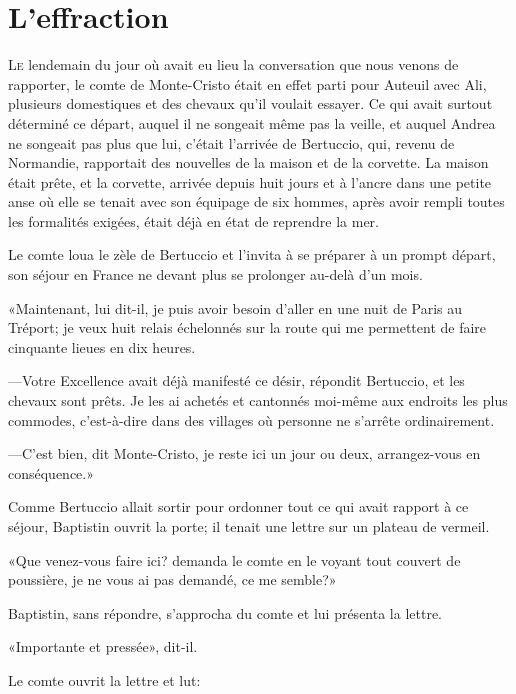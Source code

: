 \chapter{L'effraction}

\lettrine{L}{e} lendemain du jour où avait eu lieu la conversation que nous venons de rapporter, le comte de Monte-Cristo était en effet parti pour Auteuil avec Ali, plusieurs domestiques et des chevaux qu'il voulait essayer. Ce qui avait surtout déterminé ce départ, auquel il ne songeait même pas la veille, et auquel Andrea ne songeait pas plus que lui, c'était l'arrivée de Bertuccio, qui, revenu de Normandie, rapportait des nouvelles de la maison et de la corvette. La maison était prête, et la corvette, arrivée depuis huit jours et à l'ancre dans une petite anse où elle se tenait avec son équipage de six hommes, après avoir rempli toutes les formalités exigées, était déjà en état de reprendre la mer. 

Le comte loua le zèle de Bertuccio et l'invita à se préparer à un prompt départ, son séjour en France ne devant plus se prolonger au-delà d'un mois. 

«Maintenant, lui dit-il, je puis avoir besoin d'aller en une nuit de Paris au Tréport; je veux huit relais échelonnés sur la route qui me permettent de faire cinquante lieues en dix heures. 

—Votre Excellence avait déjà manifesté ce désir, répondit Bertuccio, et les chevaux sont prêts. Je les ai achetés et cantonnés moi-même aux endroits les plus commodes, c'est-à-dire dans des villages où personne ne s'arrête ordinairement. 

—C'est bien, dit Monte-Cristo, je reste ici un jour ou deux, arrangez-vous en conséquence.» 

Comme Bertuccio allait sortir pour ordonner tout ce qui avait rapport à ce séjour, Baptistin ouvrit la porte; il tenait une lettre sur un plateau de vermeil. 

«Que venez-vous faire ici? demanda le comte en le voyant tout couvert de poussière, je ne vous ai pas demandé, ce me semble?» 

Baptistin, sans répondre, s'approcha du comte et lui présenta la lettre. 

«Importante et pressée», dit-il. 

Le comte ouvrit la lettre et lut: 

